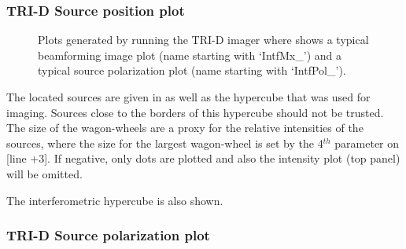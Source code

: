 \subsubsection{TRI-D Source position plot}

\begin{figure}[th]
\setlength{\unitlength}{.49\textwidth} %
	\caption{Plots generated by running the TRI-D imager where  shows a typical beamforming image plot (name starting with `IntfMx\_') and  a typical source polarization plot (name starting with `IntfPol\_').}	
\end{figure}

The located sources are given in  as well as the hypercube that was used for imaging. Sources close to the borders of this hypercube should not be trusted. The size of the wagon-wheels are a proxy for the relative intensities of the sources, where the size for the largest wagon-wheel is set by the 4$^{th}$ parameter on [line +3]. If negative, only dots are plotted and also the intensity plot (top panel) will be omitted.

The interferometric hypercube is also shown.

\subsubsection{TRI-D Source polarization plot}


